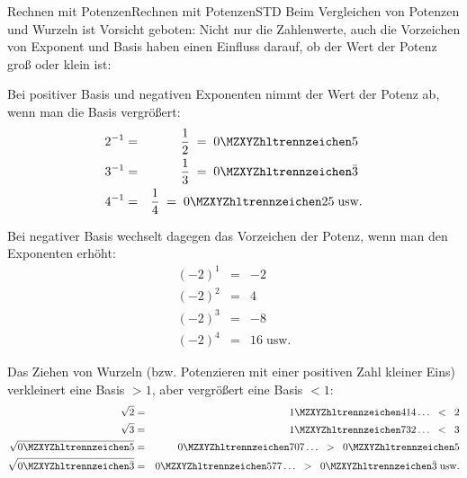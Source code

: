 \begin{MXContent}{Rechnen mit Potenzen}{Rechnen mit Potenzen}{STD}
Beim Vergleichen von Potenzen und Wurzeln ist Vorsicht geboten: Nicht nur die Zahlenwerte, auch die Vorzeichen von Exponent und Basis haben einen Einfluss darauf,
ob der Wert der Potenz groß oder klein ist:

\begin{MExample}
Bei positiver Basis und negativen Exponenten nimmt der Wert der Potenz ab, wenn man die Basis vergrößert:
\begin{eqnarray*}
2^{-1} &=& \frac12\;=\; \MZahl{0}{5}\ \\
3^{-1} &=& \frac13\;=\; \MZahl{0}{}\bar 3\ \\
4^{-1} &=& \frac14\;=\; \MZahl{0}{25}\; \text{usw.}
\end{eqnarray*}

Bei negativer Basis wechselt dagegen das Vorzeichen der Potenz, wenn man den Exponenten erhöht:
\begin{eqnarray*}
(-2)^1 &=& -2\\
(-2)^2 &=& 4\\
(-2)^3 &=& -8\\
(-2)^4 &=& 16 \; \text{usw.}
\end{eqnarray*}

Das Ziehen von Wurzeln (bzw. Potenzieren mit einer positiven Zahl kleiner Eins) verkleinert eine Basis $>1$, aber vergrößert eine Basis $<1$:
\begin{eqnarray*}
\sqrt{2} &=& \MZahl{1}{414}\ldots\;\; < \;\; 2\\
\sqrt{3} &=& \MZahl{1}{732}\ldots\;\; < \;\; 3\\
\sqrt{\MZahl{0}{5}} &=& \MZahl{0}{707}\ldots\;\; > \;\; \MZahl{0}{5}\\
\sqrt{\MZahl{0}{}\bar 3} &=& \MZahl{0}{577}\ldots\;\; > \;\; \MZahl{0}{}\bar 3\;\text{usw.}
\end{eqnarray*}

\end{MExample}


\end{MXContent}

